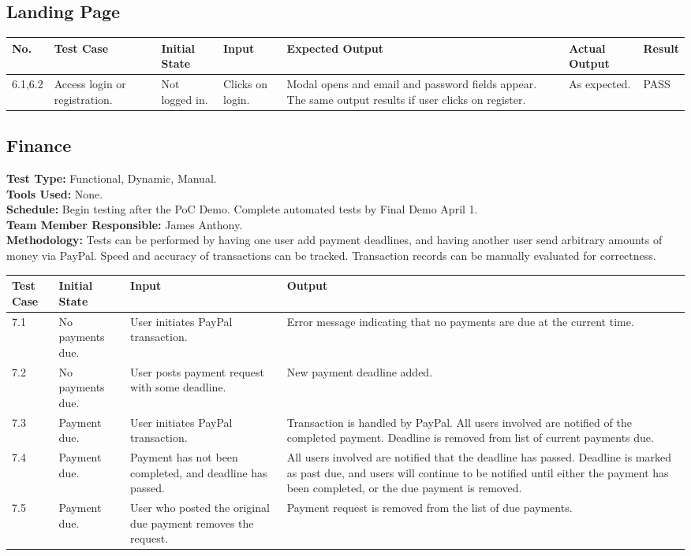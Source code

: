 \documentclass[12pt]{article}
\begin{document}
\subsection{Landing Page}

\begin{longtable}{|p{1.5cm}|p{1.5cm}|p{1.5cm}|p{2cm}|p{4cm}|p{2cm}|p{1.5cm}|}
\hline
\textbf{No.} & \textbf{Test Case}  & \textbf{Initial State} & \textbf{Input} & \textbf{Expected Output} & \textbf{Actual Output} & \textbf{Result}\\ 
\hline
6.1,6.2 & Access login or registration. & Not logged in. & Clicks on login. & Modal opens and email and password fields appear. The same output results if user clicks on register. & As expected. & PASS \\
\hline
\end{longtable}


\subsection{Finance}
\textbf{Test Type:} Functional, Dynamic, Manual. \\
\textbf{Tools Used:} None. \\
\textbf{Schedule:} Begin testing after the PoC Demo. Complete automated tests by Final Demo April 1. \\
\textbf{Team Member Responsible:} James Anthony. \\
\textbf{Methodology:} Tests can be performed by having one user add payment deadlines, and having another user send arbitrary amounts of money via PayPal. Speed and accuracy of transactions can be tracked. Transaction records can be manually evaluated for correctness.

\begin{longtable}{|p{2cm}|p{3cm}|p{5cm}|p{5cm}|}
\hline
\textbf{Test Case} & \textbf{Initial State} & \textbf{Input} & \textbf{Output} \\ \hline
7.1 & No payments due. & User initiates PayPal transaction. & Error message indicating that no payments are due at the current time.\\
\hline
7.2 & No payments due. & User posts payment request with some deadline. & New payment deadline added.\\
\hline
7.3 & Payment due. & User initiates PayPal transaction. & Transaction is handled by PayPal. All users involved are notified of the completed payment. Deadline is removed from list of current payments due.\\
\hline
7.4 & Payment due. & Payment has not been completed, and deadline has passed. & All users involved are notified that the deadline has passed. Deadline is marked as past due, and users will continue to be notified until either the payment has been completed, or the due payment is removed.\\
\hline
7.5 & Payment due. & User who posted the original due payment removes the request. & Payment request is removed from the list of due payments.\\
\hline
\end{longtable}
\end{document}

